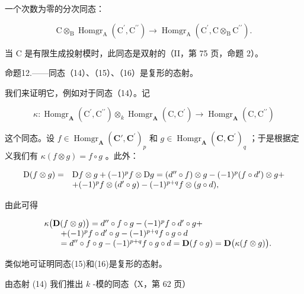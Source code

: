 一个次数为零的分次同态：

\[
\mathrm{C} \otimes_ {\mathrm{B}} \operatorname{Homgr} _ {\mathrm{A}} \left(\mathrm{C} ^ {\prime}, \mathrm{C} ^ {\prime \prime}\right)\rightarrow \operatorname{Homgr} _ {\mathrm{A}} \left(\mathrm{C} ^ {\prime}, \mathrm{C} \otimes_ {\mathrm{B}} \mathrm{C} ^ {\prime \prime}\right).\tag{16}
\]

当 C 是有限生成投射模时，此同态是双射的（II，第 75 页，命题 2）。

命题12.——同态（14）、（15）、（16）是复形的态射。

我们来证明它，例如对于同态（14）。记

\[
\kappa : \operatorname{Homgr} _ {\mathbf {A}} \left(\mathrm{C} ^ {\prime}, \mathrm{C} ^ {\prime \prime}\right) \otimes_ {k} \operatorname{Homgr} _ {\mathbf {A}} \left(\mathrm{C}, \mathrm{C} ^ {\prime}\right)\rightarrow \operatorname{Homgr} _ {\mathbf {A}} \left(\mathrm{C}, \mathrm{C} ^ {\prime \prime}\right)
\]

这个同态。设 \(f \in \operatorname{Homgr}_{\mathbf{A}}(\mathbf{C}', \mathbf{C}^{\prime})_{p}\) 和 \(g \in \operatorname{Homgr}_{\mathbf{A}}(\mathbf{C}, \mathbf{C}^{\prime})_{q}\) ；于是根据定义我们有 \(\kappa(f \otimes g) = f \circ g\) 。此外：

\[
\begin{array}{r l} \mathrm{D} (f \otimes g) = & \mathrm{D} f \otimes g + (- 1) ^ {p} f \otimes \mathrm{D} g = (d ^ {\prime \prime} \circ f) \otimes g - (- 1) ^ {p} (f \circ d ^ {\prime}) \otimes g + \\ & + (- 1) ^ {p} f \otimes (d ^ {\prime} \circ g) - (- 1) ^ {p + q} f \otimes (g \circ d), \end{array}
\]

由此可得

\[
\begin{array}{r l} & {\kappa \big (\mathbf {D} (f \otimes g) \big) = d ^ {\prime \prime} \circ f \circ g - (- 1) ^ {p} f \circ d ^ {\prime} \circ g +} \\ & {\qquad + (- 1) ^ {p} f \circ d ^ {\prime} \circ g - (- 1) ^ {p + q} f \circ g \circ d} \\ & {\qquad = d ^ {\prime \prime} \circ f \circ g - (- 1) ^ {p + q} f \circ g \circ d = \mathbf {D} (f \circ g) = \mathbf {D} \big (\kappa (f \otimes g) \big).} \end{array}
\]

类似地可证明同态(15)和(16)是复形的态射。

由态射 (14) 我们推出 \(k\) -模的同态（X，第 62 页）

